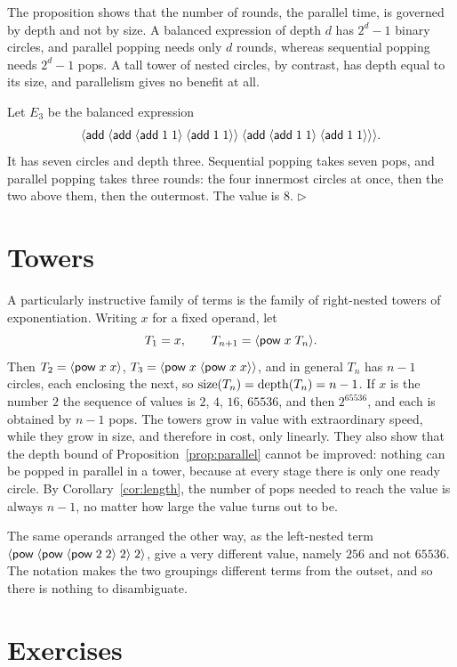 The proposition shows that the number of rounds, the parallel time, is governed by depth and not by size. A balanced expression of depth $d$ has $2^{d}-1$ binary circles, and parallel popping needs only $d$ rounds, whereas sequential popping needs $2^{d}-1$ pops. A tall tower of nested circles, by contrast, has depth equal to its size, and parallelism gives no benefit at all.

\begin{example}
Let $E_3$ be the balanced expression
\[
\langle \mathsf{add}\; \langle \mathsf{add}\; \langle \mathsf{add}\; 1\; 1\rangle\; \langle \mathsf{add}\; 1\; 1\rangle\rangle\; \langle \mathsf{add}\; \langle \mathsf{add}\; 1\; 1\rangle\; \langle \mathsf{add}\; 1\; 1\rangle\rangle\rangle .
\]
It has seven circles and depth three. Sequential popping takes seven pops, and parallel popping takes three rounds: the four innermost circles at once, then the two above them, then the outermost. The value is $8$. \hfill$\triangleright$
\end{example}

\section{Towers}

A particularly instructive family of terms is the family of right-nested towers of exponentiation. Writing $x$ for a fixed operand, let
\[
T_1 = x,\qquad T_{n+1}=\langle \mathsf{pow}\; x\; T_n\rangle.
\]
Then $T_2=\langle \mathsf{pow}\; x\; x\rangle$, $T_3=\langle \mathsf{pow}\; x\; \langle \mathsf{pow}\; x\; x\rangle\rangle$, and in general $T_n$ has $n-1$ circles, each enclosing the next, so $\operatorname{size}(T_n)=\operatorname{depth}(T_n)=n-1$. If $x$ is the number $2$ the sequence of values is $2$, $4$, $16$, $65536$, and then $2^{65536}$, and each is obtained by $n-1$ pops. The towers grow in value with extraordinary speed, while they grow in size, and therefore in cost, only linearly. They also show that the depth bound of Proposition~\ref{prop:parallel} cannot be improved: nothing can be popped in parallel in a tower, because at every stage there is only one ready circle. By Corollary~\ref{cor:length}, the number of pops needed to reach the value is always $n-1$, no matter how large the value turns out to be.

The same operands arranged the other way, as the left-nested term $\langle \mathsf{pow}\; \langle \mathsf{pow}\; \langle \mathsf{pow}\; 2\; 2\rangle\; 2\rangle\; 2\rangle$, give a very different value, namely $256$ and not $65536$. The notation makes the two groupings different terms from the outset, and so there is nothing to disambiguate.

\section*{Exercises}

